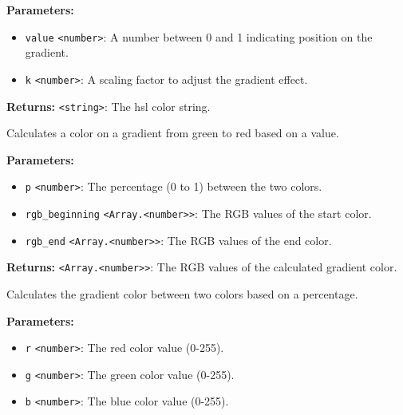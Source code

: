 \documentclass[12pt,a4paper]{article}
\begin{document}
\vspace{5mm}
\noindent {}


\noindent \textbf{Parameters:}
\begin{itemize}
  \item \texttt{value} \texttt{<number>}: A number between 0 and 1 indicating position on the gradient.
  \item \texttt{k} \texttt{<number>}: A scaling factor to adjust the gradient effect.
\end{itemize}

\noindent \textbf{Returns:} \texttt{<string>}: The hsl color string.

\noindent Calculates a color on a gradient from green to red based on a value.

\vspace{5mm}
\noindent {}


\noindent \textbf{Parameters:}
\begin{itemize}
  \item \texttt{p} \texttt{<number>}: The percentage (0 to 1) between the two colors.
  \item \texttt{rgb\_beginning} \texttt{<Array.<number>>}: The RGB values of the start color.
  \item \texttt{rgb\_end} \texttt{<Array.<number>>}: The RGB values of the end color.
\end{itemize}

\noindent \textbf{Returns:} \texttt{<Array.<number>>}: The RGB values of the calculated gradient color.

\noindent Calculates the gradient color between two colors based on a percentage.

\vspace{5mm}
\noindent {}


\noindent \textbf{Parameters:}
\begin{itemize}
  \item \texttt{r} \texttt{<number>}: The red color value (0-255).
  \item \texttt{g} \texttt{<number>}: The green color value (0-255).
  \item \texttt{b} \texttt{<number>}: The blue color value (0-255).
\end{itemize}
\end{document}
